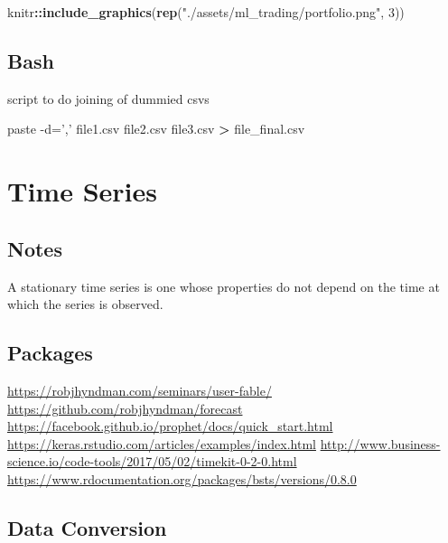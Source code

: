 \documentclass[]{book}
\newenvironment{Shaded}{\begin{snugshade}}{\end{snugshade}}
\newcommand{\KeywordTok}[1]{\textcolor[rgb]{0.13,0.29,0.53}{\textbf{#1}}}
\newcommand{\DecValTok}[1]{\textcolor[rgb]{0.00,0.00,0.81}{#1}}
\newcommand{\StringTok}[1]{\textcolor[rgb]{0.31,0.60,0.02}{#1}}
\newcommand{\OperatorTok}[1]{\textcolor[rgb]{0.81,0.36,0.00}{\textbf{#1}}}
\newcommand{\ExtensionTok}[1]{#1}
\newcommand{\NormalTok}[1]{#1}
\theoremstyle{definition}
\theoremstyle{definition}
\theoremstyle{definition}
\theoremstyle{remark}
\begin{document}
\begin{Shaded}
\begin{Highlighting}[]
\NormalTok{knitr}\OperatorTok{::}\KeywordTok{include_graphics}\NormalTok{(}\KeywordTok{rep}\NormalTok{(}\StringTok{"./assets/ml_trading/portfolio.png"}\NormalTok{, }\DecValTok{3}\NormalTok{))}
\end{Highlighting}
\end{Shaded}

\section{Bash}\label{bash}

script to do joining of dummied csvs

\begin{Shaded}
\begin{Highlighting}[]
\ExtensionTok{paste}\NormalTok{ -d=}\StringTok{','}\NormalTok{ file1.csv file2.csv file3.csv }\OperatorTok{>}\NormalTok{ file_final.csv}
\end{Highlighting}
\end{Shaded}

\chapter{Time Series}\label{time-series}

\section{Notes}\label{notes}

A stationary time series is one whose properties do not depend on the
time at which the series is observed.

\section{Packages}\label{packages}

\url{https://robjhyndman.com/seminars/user-fable/}
\url{https://github.com/robjhyndman/forecast}
\url{https://facebook.github.io/prophet/docs/quick_start.html}
\url{https://keras.rstudio.com/articles/examples/index.html}
\url{http://www.business-science.io/code-tools/2017/05/02/timekit-0-2-0.html}
\url{https://www.rdocumentation.org/packages/bsts/versions/0.8.0}

\section{Data Conversion}\label{data-conversion}
\end{document}
